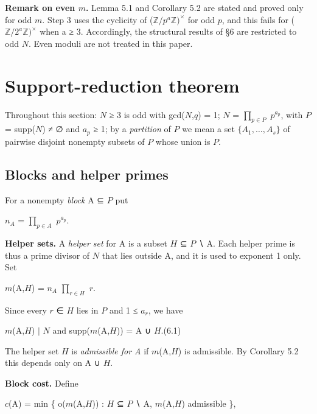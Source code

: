 \documentclass[pdflatex,sn-mathphys-num]{sn-jnl}
\theoremstyle{thmstyleone}
\theoremstyle{thmstylethree}
\begin{document}
\textbf{Remark on even \(m\).} Lemma 5.1 and Corollary 5.2 are stated and proved only for odd \(m\). Step 3 uses the cyclicity of (\(ℤ/p^aℤ)^×\) for odd \(p\), and this fails for (\(ℤ/2^aℤ)^×\) when a ≥ 3. Accordingly, the structural results of §6 are restricted to odd \(N\). Even moduli are not treated in this paper.

\section{Support-reduction theorem}

Throughout this section: \(N\) ≥ 3 is odd with gcd(\(N\),\(q\)) = 1; \(N\) = \(∏_{p∈P}\) \(p^{a_p}\), with \(P\) = supp(\(N\)) ≠ ∅ and \(a_p\) ≥ 1; by a \emph{partition} of \(P\) we mean a set \(\{A_1,\ldots,A_s\}\) of pairwise disjoint nonempty subsets of \(P\) whose union is \(P\).

\subsection{Blocks and helper primes}

For a nonempty \emph{block} A ⊆ \(P\) put

\begin{center}\(n_A\) = \(∏_{p∈A}\) \(p^{a_p}\).\end{center}

\textbf{Helper sets.} A \emph{helper set} for A is a subset \(H\) ⊆ \(P\) ∖ A. Each helper prime is thus a prime divisor of \(N\) that lies outside A, and it is used to exponent 1 only. Set

\begin{center}\(m\)(A,\(H\)) = \(n_A\) \(∏_{r∈H}\) \(r\).\end{center}

Since every \(r\) ∈ \(H\) lies in \(P\) and 1 ≤ \(a_r\), we have

\begin{center}\(m\)(A,\(H\)) \(\mid\) \(N\) and supp(\(m\)(A,\(H\))) = A ∪ \(H\).\qquad (6.1)\end{center}

The helper set \(H\) is \emph{admissible for A} if \(m\)(A,\(H\)) is admissible. By Corollary 5.2 this depends only on A ∪ \(H\).

\textbf{Block cost.} Define

\begin{center}\(c\)(A) = min \{ o(\(m\)(A,\(H\))) : \(H\) ⊆ \(P\) ∖ A, \(m\)(A,\(H\)) admissible \},\end{center}
\end{document}
